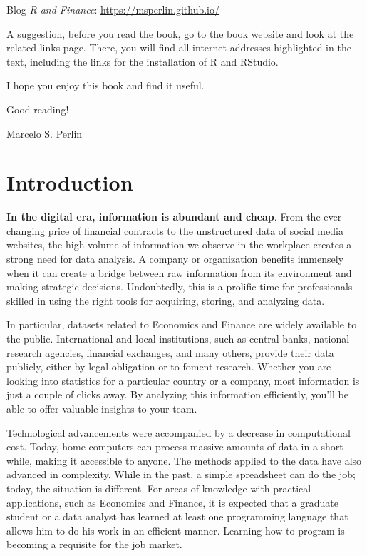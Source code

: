 \documentclass[11pt,]{book}
\begin{document}
Blog \emph{R and Finance}: \url{https://msperlin.github.io/}

\vspace{0.5cm}

A suggestion, before you read the book, go to the
\href{https://sites.google.com/view/pmfdr/home}{book website} and look
at the related links page. There, you will find all internet addresses
highlighted in the text, including the links for the installation of R
and RStudio.

I hope you enjoy this book and find it useful.

Good reading!

Marcelo S. Perlin

\hypertarget{Introduction}{\chapter{Introduction}\label{Introduction}}

\textbf{In the digital era, information is abundant and cheap}. From the
ever-changing price of financial contracts to the unstructured data of
social media websites, the high volume of information we observe in the
workplace creates a strong need for data analysis. A company or
organization benefits immensely when it can create a bridge between raw
information from its environment and making strategic decisions.
Undoubtedly, this is a prolific time for professionals skilled in using
the right tools for acquiring, storing, and analyzing data.

In particular, datasets related to Economics and Finance are widely
available to the public. International and local institutions, such as
central banks, national research agencies, financial exchanges, and many
others, provide their data publicly, either by legal obligation or to
foment research. Whether you are looking into statistics for a
particular country or a company, most information is just a couple of
clicks away. By analyzing this information efficiently, you'll be able
to offer valuable insights to your team.

Technological advancements were accompanied by a decrease in
computational cost. Today, home computers can process massive amounts of
data in a short while, making it accessible to anyone. The methods
applied to the data have also advanced in complexity. While in the past,
a simple spreadsheet can do the job; today, the situation is different.
For areas of knowledge with practical applications, such as Economics
and Finance, it is expected that a graduate student or a data analyst
has learned at least one programming language that allows him to do his
work in an efficient manner. Learning how to program is becoming a
requisite for the job market.
\end{document}
